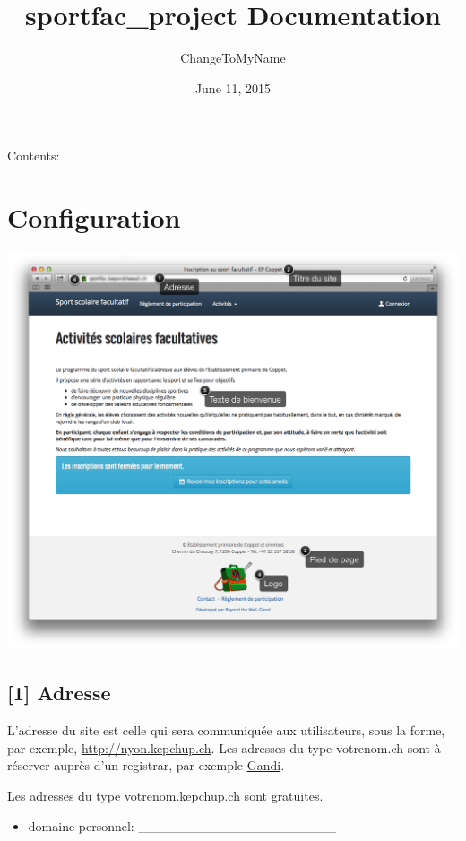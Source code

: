 \documentclass[letterpaper,10pt,english]{sphinxmanual}
\title{sportfac_project Documentation}
\date{June 11, 2015}
\author{ChangeToMyName}
\begin{document}
\maketitle
\tableofcontents
{}\label{index::doc}


Contents:


\chapter{Configuration}
\label{configurer:welcome-to-sportfac-project-s-documentation}\label{configurer:configuration}\label{configurer::doc}
\includegraphics{configure.png}


\section{{[}1{]} Adresse}
\label{configurer:adresse}
L'adresse du site est celle qui sera communiquée aux utilisateurs, sous la forme, par exemple, \href{http://nyon.kepchup.ch}{http://nyon.kepchup.ch}.
Les adresses du type votrenom.ch sont à réserver auprès d'un registrar, par exemple \href{http://gandi.net}{Gandi}.

Les adresses du type votrenom.kepchup.ch sont gratuites.
\begin{itemize}
\item {} 
domaine personnel: \_\_\_\_\_\_\_\_\_\_\_\_\_\_\_\_\_\_\_\_\_

\end{itemize}
\end{document}
